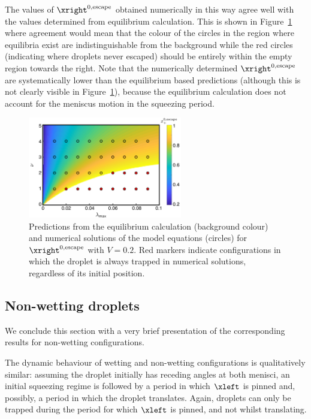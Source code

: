 The values of $\xright^{0,\text{escape}}$ obtained numerically in this way agree well with the values determined from  equilibrium calculation. This is shown in Figure~\ref{fig:Ch4:Hysteresis:numerics_comparison} where agreement would mean that the colour of the circles in the region where equilibria exist are indistinguishable from the background while the red circles (indicating where droplets never escaped) should be entirely within the empty region towards the right. Note that the numerically determined $\xright^{0,\text{escape}}$ are systematically lower than the equilibrium based predictions (although this is not clearly visible in Figure~\ref{fig:Ch4:Hysteresis:numerics_comparison}), because the equilibrium calculation does not account for the meniscus motion in the squeezing period.

\begin{figure}
\centering
\includegraphics[width = 0.6\textwidth]{numerics_comparison}
\caption{Predictions from the equilibrium calculation (background colour) and numerical solutions of the model equations (circles) for $\xright^{0,\text{escape}}$ with $V = 0.2$. Red markers indicate configurations in which the droplet is always trapped in numerical solutions, regardless of its initial position.}\label{fig:Ch4:Hysteresis:numerics_comparison}
\end{figure}

\subsection{Non-wetting droplets}\label{S:Ch4:Hysteresis:NonWetting}
We conclude this section with a very brief presentation of the corresponding results for non-wetting configurations.

The dynamic behaviour of wetting and non-wetting configurations is qualitatively similar: assuming the droplet initially has receding angles at both menisci, an initial squeezing regime is followed by a period in which $\xleft$ is pinned and, possibly, a period in which the droplet translates. Again, droplets can only be trapped during the period for which $\xleft$ is pinned, and not whilst translating.

